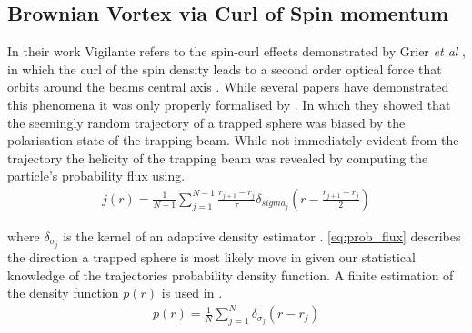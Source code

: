 \subsection{Brownian Vortex via Curl of Spin momentum}
In their work Vigilante refers to the spin-curl effects 
demonstrated by Grier \textit{et al} \cite{Ruffner2012}, 
in which the curl of the spin density leads to a second 
order optical force that orbits around the beams central 
axis \cite{Yevick2017}. While several papers have 
demonstrated this phenomena \cite{Zhao2007, Zhao2009, 
Wang2010} it was only properly formalised by \cite{Ruffner2012}. 
In which they showed that the seemingly random trajectory 
of a trapped sphere was biased by the polarisation state 
of the trapping beam. While not immediately evident from 
the trajectory the helicity of the trapping beam was revealed 
by computing the particle's probability flux using.
\begin{align}
	j(r) = \frac{1}{N-1} \sum_{j=1}^{N-1}
	\frac{r_{j+1}-r_j}{\tau}\delta_{sigma_j}\left(r-\frac{r_{j+1}+r_j}{2}\right)
	\label{eq:prob_flux}
\end{align}

where $\delta_{\sigma_j}$ is the kernel of an adaptive 
density estimator \cite{Silverman1986}. \eqref{eq:prob_flux} 
describes the direction a trapped sphere is most likely 
move in given our statistical knowledge of the 
trajectories probability density function. A finite 
estimation of the density function $p(r)$ is used in 
\cite{Ruffner2012}.
\begin{align}
	p(r) = \frac{1}{N}\sum_{j=1}^N \delta_{\sigma_j}(r-r_j)
	\label{eq:prob_density}
\end{align}


